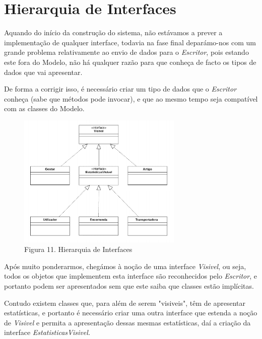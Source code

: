 \chapter{Hierarquia de Interfaces}

    Aquando do início da construção do sistema, não estávamos a prever a implementação de qualquer interface, todavia na fase final deparámo-nos com um grande problema relativamente ao envio de dados para o \textit{Escritor}, pois estando este fora do Modelo, não há qualquer razão para que conheça de facto os tipos de dados que vai apresentar.

    De forma a corrigir isso, é necessário criar um tipo de dados que o \textit{Escritor} conheça (sabe que métodos pode invocar), e que ao mesmo tempo seja compatível com as classes do Modelo.

    \begin{figure}[hb!]
        \centering
        \includegraphics[width=0.7\textwidth]{imagens/9.png}
        \caption*{Figura 11. Hierarquia de Interfaces}
    \end{figure}

    Após muito ponderarmos, chegámos à noção de uma interface \textit{Visivel}, ou seja, todos os objetos que implementem esta interface são reconhecidos pelo \textit{Escritor}, e portanto podem ser apresentados sem que este saiba que classes estão implícitas.

    Contudo existem classes que, para além de serem "visiveis", têm de apresentar estatísticas, e portanto é necessário criar uma outra interface que estenda a noção de \textit{Visivel} e permita a apresentação dessas mesmas estatísticas, daí a criação da interface \textit{EstatisticasVisivel.}